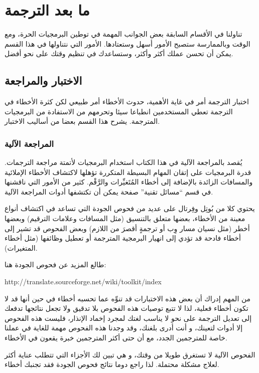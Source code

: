 \chapter{ما بعد الترجمة}
تناولنا في الأقسام السابقة بعض الجوانب المهمة في توطين البرمجيات الحرة،
ومع الوقت وبالممارسة ستصبح الأمور أسهل وستعتادها. الأمور التي نتناولها
في هذا القسم يمكن أن تحسن عملك أكثر وأكثر، وستساعدك في تنظيم وقتك على
نحو أفضل.

\section[ref:34441726]{الاختبار والمراجعة}
اختبار الترجمة أمر في غاية
الأهمية، حدوث الأخطاء أمر طبيعي لكن كثرة الأخطاء في الترجمة تعطي
المستخدمين انطباعا سيئا وتحرمهم من الاستفادة من البرمجيات المترجمة.
يشرح هذا القسم بعضا من أساليب الاختبار.

\subsection[ref:36134309]{المراجعة الآلية}
يُقصد بالمراجعة الآلية في هذا
الكتاب استخدام البرمجيات لأتمتة مراجعة الترجمات. قدرة البرمجيات على
إتقان المهام البسيطة المتكررة تؤهلها لاكتشاف الأخطاء الإملائية
والمسافات الزائدة بالإضافة إلى أخطاء المُتَغيِّرات والرَّقْم. كثير من
الأمور التي ناقشنها في قسم “مسائل تقنية” صفحة
\at[ref:32352020] يمكن أن تكتشفها أدوات المراجعة الآلية.

يحتوي كلا من بُوتِل وفِرتال على عديد من فحوص الجودة التي تساعد في اكتشاف
أنواع معينة من الأخطاء، بعضها متعلق بالتنسيق (مثل المسافات وعلامات
الترقيم) وبعضها أخطر (مثل نسيان مسار وِب أو ترجمةٍ أقصرَ من اللازم)
وبعض الفحوص قد تشير إلى أخطاء فادحة قد تؤدي إلى انهيار البرمجية
المترجمة أو تعطيل وظائفها (مثل أخطاء المتغيرات).

طالع المزيد عن فحوص الجودة هنا:

http://translate.sourceforge.net/wiki/toolkit/index

من المهم إدراك أن بعض هذه الاختبارات قد تنوِّه عما تحسبه أخطاء في حين
أنها قد لا تكون أخطاء فعلية، لذا لا تتبع توصيات هذه الفحوص بلا تدقيق
ولا تجعل نتائجها تدفعك إلى تعديل الترجمة على نحو لا يناسب لغتك لمجرد
إخماد الإنذار، فليست هذه الفحوص إلا أدوات لتعينك، و أنت أدرى بلغنك، وقد
وجدنا هذه الفحوص مهمة للغاية في عملنا خاصة للمترجمين الجدد، مع أن حتى
أكثر المترجمين خبرة يقعون في الأخطاء.

الفحوص الآلية لا تستغرق طويلا من وقتك، و هي تبين لك الأجزاء التي تتطلب
عناية أكثر لعلاج مشكلة محتملة. لذا راجع دوما نتائج فحوص الجودة فقد
تجنبك أخطاء.

